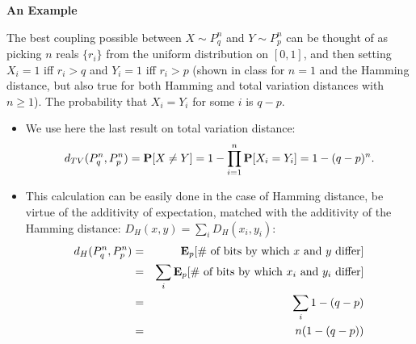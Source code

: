 \documentclass[11pt]{article} \usepackage{amssymb}
\newcommand{\E}{{\bf E}} \newcommand{\Cov}{{\bf Cov}}
\begin{document}
{\bf An Example}

The best coupling possible between $X\sim P_q^n$ and $Y\sim P_p^n$ can be 
thought of as picking $n$ reals $\{r_i\}$ from the uniform distribution on 
$[0,1]$, and then setting $X_i=1$ iff $r_i>q$ and $Y_i=1$ iff $r_i>p$ 
(shown in class for $n=1$ and the Hamming distance, but also true 
for both Hamming and total variation distances with $n\geq 1$). 
The probability that $X_i= Y_i$ for some $i$ is $q-p$. 
\begin{itemize}
\item We use here the last result on total variation distance:
\begin{eqnarray*}
  d_{TV}(P_q^n,P_p^n) = \P[X\neq Y]=1-\prod_{i=1}^n\P[X_i= Y_i]=1-(q-p)^n.
\end{eqnarray*}
\item
This calculation can be easily done in the case of Hamming distance, be virtue
of the additivity of expectation, matched with the additivity of the Hamming 
distance: $D_H(x,y)=\sum_iD_H(x_i,y_i)$:
\begin{eqnarray*}
  d_H(P_q^n,P_p^n) &=& \E_p[\mbox{\# of bits by which $x$ and $y$ differ}]
  \\ &=& \sum_i\E_p[\mbox{\# of bits by which $x_i$ and $y_i$ differ}]
  \\ &=& \sum_i1-(q-p)
  \\ &=& n(1-(q-p))
\end{eqnarray*}

\end{itemize}
\end{document}
